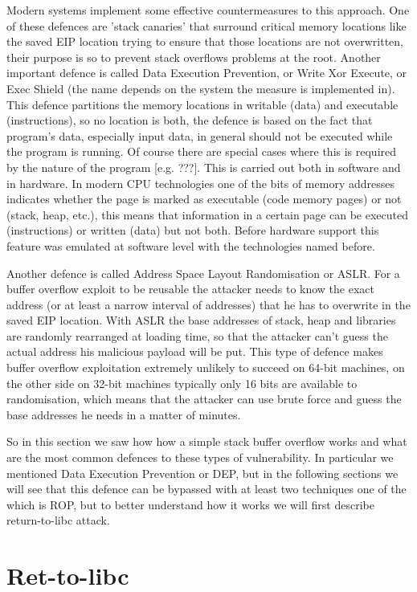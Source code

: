 \documentclass[Lau,binding=0.6cm]{sapthesis}
\begin{document}
Modern systems implement some effective countermeasures to this approach.
One of these defences are 'stack canaries' that surround critical memory locations like the saved EIP location trying to ensure that those locations are not overwritten, their purpose is so to prevent stack overflows problems at the root.
Another important defence is called Data Execution Prevention, or Write Xor Execute, or Exec Shield (the name depends on the system the measure is implemented in). This defence partitions the memory locations in writable (data) and executable (instructions), so no location is both, the defence is based on the fact that program’s data, especially input data, in general should not be executed while the program is running. Of course there are special cases where this is required by the nature of the program [e.g. ???]. This is carried out both in software and in hardware. In modern CPU technologies one of the bits of memory addresses indicates whether the page is marked as executable (code memory pages) or not (stack, heap, etc.), this means that information in a certain page can be executed (instructions) or written (data) but not both. Before hardware support this feature was emulated at software level with the technologies named before.

Another defence is called Address Space Layout Randomisation or ASLR. For a buffer overflow exploit to be reusable the attacker needs to know the exact address (or at least a narrow interval of addresses) that he has to overwrite in the saved EIP location. With ASLR the base addresses of stack, heap and libraries are randomly rearranged at loading time, so that the attacker can’t guess the actual address his malicious payload will be put. This type of defence makes buffer overflow exploitation extremely unlikely to succeed on 64-bit machines, on the other side on 32-bit machines typically only 16 bits are available to randomisation, which means that the attacker can use brute force and guess the base addresses he needs in a matter of minutes.

So in this section we saw how how a simple stack buffer overflow works and what are the most common defences to these types of vulnerability. In particular we mentioned Data Execution Prevention or DEP, but in the following sections we will see that this defence can be bypassed with at least two techniques one of the which is ROP, but to better understand how it works we will first describe return-to-libc attack.


\section{Ret-to-libc}
\end{document}
